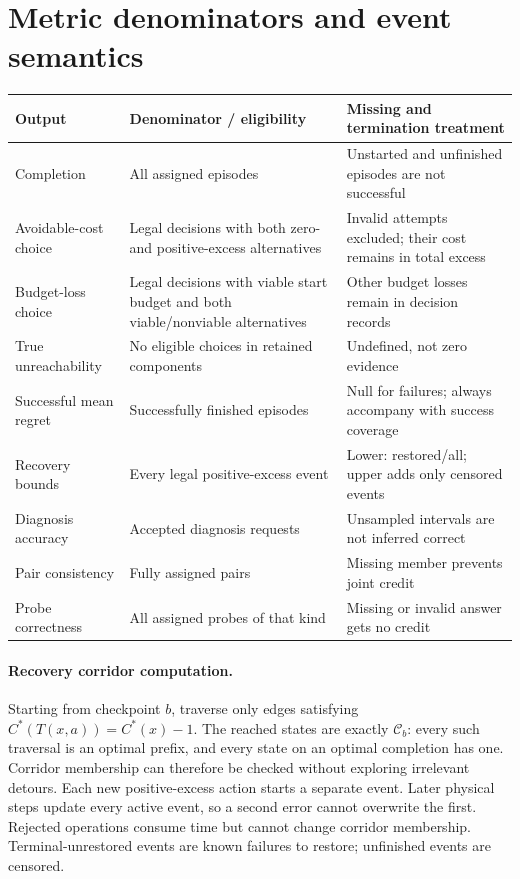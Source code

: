 \section{Metric denominators and event semantics}
\begin{center}\small
\begin{tabular}{p{}p{}p{}}\toprule
Output & Denominator / eligibility & Missing and termination treatment\\\midrule
Completion & All assigned episodes & Unstarted and unfinished episodes are not successful\\
Avoidable-cost choice & Legal decisions with both zero- and positive-excess alternatives & Invalid attempts excluded; their cost remains in total excess\\
Budget-loss choice & Legal decisions with viable start budget and both viable/nonviable alternatives & Other budget losses remain in decision records\\
True unreachability & No eligible choices in retained components & Undefined, not zero evidence\\
Successful mean regret & Successfully finished episodes & Null for failures; always accompany with success coverage\\
Recovery bounds & Every legal positive-excess event & Lower: restored/all; upper adds only censored events\\
Diagnosis accuracy & Accepted diagnosis requests & Unsampled intervals are not inferred correct\\
Pair consistency & Fully assigned pairs & Missing member prevents joint credit\\
Probe correctness & All assigned probes of that kind & Missing or invalid answer gets no credit\\\bottomrule
\end{tabular}
\end{center}

\paragraph{Recovery corridor computation.}
Starting from checkpoint $b$, traverse only edges satisfying
$C^*(T(x,a))=C^*(x)-1$. The reached states are exactly
$\mathcal C_b$: every such traversal is an optimal prefix, and every state
on an optimal completion has one. Corridor membership can therefore be
checked without exploring irrelevant detours.
Each new positive-excess action starts a separate event. Later physical
steps update every active event, so a second error cannot overwrite the
first. Rejected operations consume time but cannot change corridor
membership. Terminal-unrestored events are known failures to restore;
unfinished events are censored.

